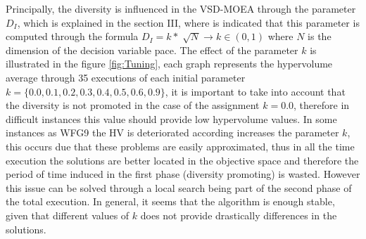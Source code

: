 Principally, the diversity is influenced in the VSD-MOEA through the parameter $D_I$, which is explained in the section III, where is indicated that this parameter is computed through the formula $D_I = k * \sqrt[]{N}  \rightarrow k \in (0,1)$ where $N$ is the dimension of the decision variable pace.
%
The effect of the parameter $k$ is illustrated in the figure \ref{fig:Tuning}, each graph represents the hypervolume average through 35 executions of each initial parameter $k = \{ 0.0, 0.1, 0.2, 0.3, 0.4, 0.5, 0.6, 0.9 \}$, it is important to take into account that the diversity is not promoted in the case of the assignment $k= 0.0$, therefore in difficult instances this value should provide low hypervolume values. 
%
In some instances as WFG9 the HV is deteriorated according increases the parameter $k$, this occurs due that these problems are easily approximated, thus in all the time execution the solutions are better located in the objective space and therefore the period of time induced in the first phase (diversity promoting) is wasted.
%
However this issue can be solved through a local search being part of the second phase of the total execution.
%
In general, it seems that the algorithm is enough stable, given that different values of $k$ does not provide drastically differences in the solutions.

